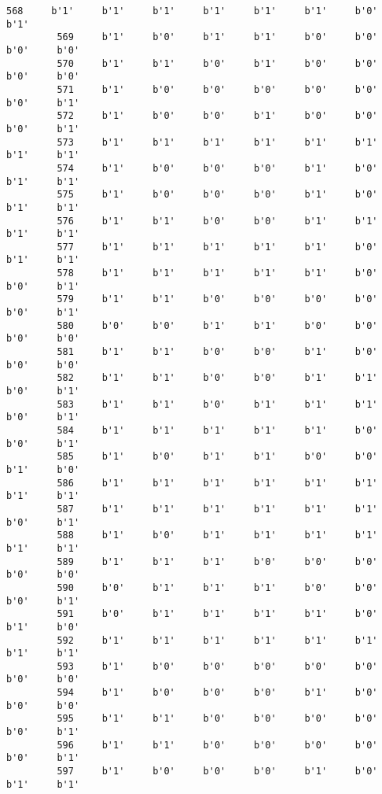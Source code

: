 \documentclass[11pt]{article}
\begin{document}
\begin{Verbatim}[commandchars=\\\{\}]
         568     b'1'     b'1'     b'1'     b'1'     b'1'     b'1'     b'0'     b'1'   
         569     b'1'     b'0'     b'1'     b'1'     b'0'     b'0'     b'0'     b'0'   
         570     b'1'     b'1'     b'0'     b'1'     b'0'     b'0'     b'0'     b'0'   
         571     b'1'     b'0'     b'0'     b'0'     b'0'     b'0'     b'0'     b'1'   
         572     b'1'     b'0'     b'0'     b'1'     b'0'     b'0'     b'0'     b'1'   
         573     b'1'     b'1'     b'1'     b'1'     b'1'     b'1'     b'1'     b'1'   
         574     b'1'     b'0'     b'0'     b'0'     b'1'     b'0'     b'1'     b'1'   
         575     b'1'     b'0'     b'0'     b'0'     b'1'     b'0'     b'1'     b'1'   
         576     b'1'     b'1'     b'0'     b'0'     b'1'     b'1'     b'1'     b'1'   
         577     b'1'     b'1'     b'1'     b'1'     b'1'     b'0'     b'1'     b'1'   
         578     b'1'     b'1'     b'1'     b'1'     b'1'     b'0'     b'0'     b'1'   
         579     b'1'     b'1'     b'0'     b'0'     b'0'     b'0'     b'0'     b'1'   
         580     b'0'     b'0'     b'1'     b'1'     b'0'     b'0'     b'0'     b'0'   
         581     b'1'     b'1'     b'0'     b'0'     b'1'     b'0'     b'0'     b'0'   
         582     b'1'     b'1'     b'0'     b'0'     b'1'     b'1'     b'0'     b'1'   
         583     b'1'     b'1'     b'0'     b'1'     b'1'     b'1'     b'0'     b'1'   
         584     b'1'     b'1'     b'1'     b'1'     b'1'     b'0'     b'0'     b'1'   
         585     b'1'     b'0'     b'1'     b'1'     b'0'     b'0'     b'1'     b'0'   
         586     b'1'     b'1'     b'1'     b'1'     b'1'     b'1'     b'1'     b'1'   
         587     b'1'     b'1'     b'1'     b'1'     b'1'     b'1'     b'0'     b'1'   
         588     b'1'     b'0'     b'1'     b'1'     b'1'     b'1'     b'1'     b'1'   
         589     b'1'     b'1'     b'1'     b'0'     b'0'     b'0'     b'0'     b'0'   
         590     b'0'     b'1'     b'1'     b'1'     b'0'     b'0'     b'0'     b'1'   
         591     b'0'     b'1'     b'1'     b'1'     b'1'     b'0'     b'1'     b'0'   
         592     b'1'     b'1'     b'1'     b'1'     b'1'     b'1'     b'1'     b'1'   
         593     b'1'     b'0'     b'0'     b'0'     b'0'     b'0'     b'0'     b'0'   
         594     b'1'     b'0'     b'0'     b'0'     b'1'     b'0'     b'0'     b'0'   
         595     b'1'     b'1'     b'0'     b'0'     b'0'     b'0'     b'0'     b'1'   
         596     b'1'     b'1'     b'0'     b'0'     b'0'     b'0'     b'0'     b'1'   
         597     b'1'     b'0'     b'0'     b'0'     b'1'     b'0'     b'1'     b'1'   

\end{Verbatim}
\end{document}
